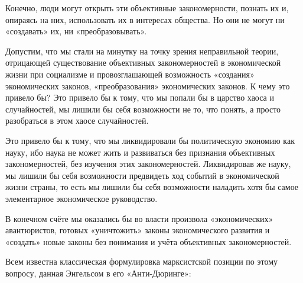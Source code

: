 \documentclass[12pt, a4paper, openany]{book}
\begin{document}
Конечно, люди могут открыть эти объективные закономерности, познать их и, опираясь на них, использовать их в интересах общества. Но они не могут ни «создавать» их, ни «преобразовывать».



Допустим, что мы стали на минутку на точку зрения неправильной теории, отрицающей существование объективных закономерностей в экономической жизни при социализме и провозглашающей возможность «создания» экономических законов, «преобразования» экономических законов. К чему это привело бы? Это привело бы к тому, что мы попали бы в царство хаоса и случайностей, мы лишили бы себя возможности не то, что понять, а просто разобраться в этом хаосе случайностей.



Это привело бы к тому, что мы ликвидировали бы политическую экономию как науку, ибо наука не может жить и развиваться без признания объективных закономерностей, без изучения этих закономерностей. Ликвидировав же науку, мы лишили бы себя возможности предвидеть ход событий в экономической жизни страны, то есть мы лишили бы себя возможности наладить хотя бы самое элементарное экономическое руководство.



В конечном счёте мы оказались бы во власти произвола «экономических» авантюристов, готовых «уничтожить» законы экономического развития и «создать» новые законы без понимания и учёта объективных закономерностей.



Всем известна классическая формулировка марксистской позиции по этому вопросу, данная Энгельсом в его «Анти-Дюринге»:
\end{document}
